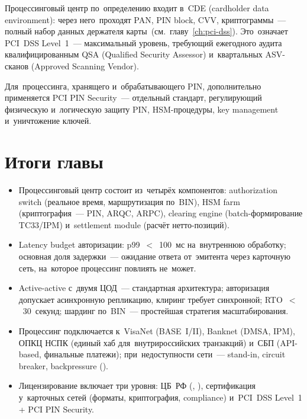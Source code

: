 Процессинговый центр по~определению входит в~CDE (cardholder
data environment): через него~проходят PAN, PIN block,
CVV, криптограммы~--- полный набор данных держателя
карты~(см.~главу~\ref{ch:pci-dss}). Это~означает PCI~DSS
Level~1~--- максимальный уровень, требующий ежегодного
аудита квалифицированным QSA (Qualified Security Assessor)
и~квартальных ASV-сканов (Approved Scanning Vendor).

Для~процессинга, хранящего и~обрабатывающего PIN, дополнительно
применяется PCI PIN Security~--- отдельный стандарт, регулирующий
физическую и~логическую защиту PIN, HSM-процедуры, key management
и~уничтожение ключей.


\section*{Итоги главы}

\begin{itemize}
  \item Процессинговый центр состоит из~четырёх компонентов:
        authorization switch (реальное время, маршрутизация
        по~BIN), HSM farm (криптография~--- PIN, ARQC, ARPC),
        clearing engine (batch-формирование TC33/IPM)
        и~settlement module (расчёт нетто-позиций).
  \item Latency budget авторизации: p99~$<$~100~мс на~внутреннюю
        обработку; основная доля задержки~--- ожидание ответа
        от~эмитента через карточную сеть, на~которое процессинг
        повлиять не~может.
  \item Active-active с~двумя ЦОД~--- стандартная архитектура;
        авторизация допускает асинхронную репликацию,
        клиринг требует синхронной; RTO~$<$~30~секунд;
        шардинг по~BIN~--- простейшая стратегия масштабирования.
  \item Процессинг подключается к~VisaNet (BASE~I/II),
        Banknet (DMSA, IPM), ОПКЦ НСПК (единый хаб
        для~внутрироссийских транзакций) и~СБП (API-based,
        финальные платежи); при~недоступности сети~---
        stand-in, circuit breaker, backpressure ().
  \item Лицензирование включает три уровня: ЦБ~РФ
        (, ), сертификация
        у~карточных сетей (форматы, криптография, compliance)
        и~PCI~DSS Level~1 + PCI PIN Security.
\end{itemize}
